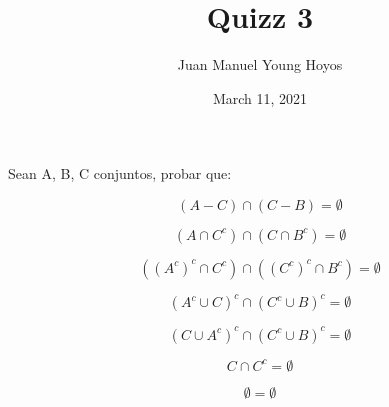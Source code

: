 \documentclass[12pt, letterpaper, twoside]{article}
\title{Quizz 3}
\author{Juan Manuel Young Hoyos}
\date{March 11, 2021}
\begin{document}
\maketitle

Sean A, B, C conjuntos, probar que:

\[ (A - C) \cap (C - B) = \emptyset \]

\[ (A \cap C^c) \cap (C \cap B^c) = \emptyset \]

\[ ((A^c)^c \cap C^c) \cap ((C^c)^c \cap B^c) = \emptyset \]

\[ (A^c \cup C)^c \cap (C^c \cup B)^c = \emptyset \]

\[ (C \cup A^c)^c \cap (C^c \cup B)^c = \emptyset \]

\[ C \cap C^c = \emptyset \]

\[ \emptyset = \emptyset \]
\end{document}
